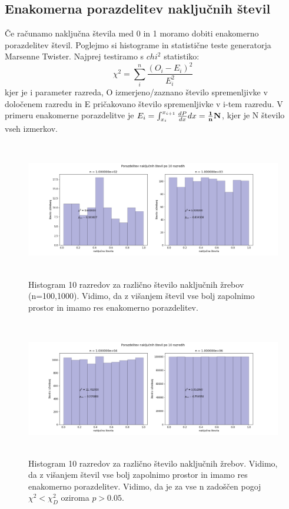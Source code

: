 \documentclass[11pt, a4paper]{article}
\begin{document}
\subsection{Enakomerna porazdelitev naključnih števil}
Če računamo naključna števila med 0 in 1 moramo dobiti enakomerno porazdelitev števil. Poglejmo si histograme in statistične teste generatorja Marsenne Twister. Najprej testiramo s $chi^2$ statistiko: 
\begin{equation}
\chi^2 = \sum_i^n \frac{(O_i-E_i)^2}{E_i^2}
\end{equation}
kjer je i parameter razreda, O izmerjeno/zaznano število spremenljivke v določenem razredu in E pričakovano število spremenljivke v i-tem razredu. V primeru enakomerne porazdelitve je $E_i = \int_{x_{i}}^{x_{i+1}} \frac{dP}{dx} dx = \bf{\frac{1}{n} N}$, kjer je N število vseh izmerkov.
\begin{figure}[H]
\hspace*{-2.5cm}  
  \includegraphics[width=22cm, height=6cm]{enakomerna_1.png}
 \caption{Histogram 10 razredov za različno število naključnih žrebov (n=100,1000). Vidimo, da z višanjem števil vse bolj zapolnimo prostor in imamo res enakomerno porazdelitev.}
\end{figure}
\begin{figure}[H]
\hspace*{-2.5cm}  
  \includegraphics[width=22cm, height=6cm]{enakomerna2.png}
 \caption{Histogram 10 razredov za različno število naključnih žrebov. Vidimo, da z višanjem števil vse bolj zapolnimo prostor in imamo res enakomerno porazdelitev. Vidimo, da je za vse n zadoščen pogoj $\chi^2 < \chi_D^2$ oziroma $p > 0.05$. }
\end{figure}
\end{document}
